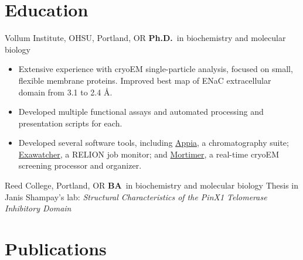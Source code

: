 \documentclass{prometheus_cv}
\begin{document}
\section{Education}
	{%
		Vollum Institute, OHSU, Portland, OR}
	{%
		\textbf{Ph.D.}~in biochemistry and molecular biology}
	{%
	\begin{itemize}
		\item Extensive experience with cryoEM single-particle analysis, focused on small, flexible membrane proteins. Improved best map of ENaC extracellular domain from 3.1 to 2.4 \AA{}.
		\item Developed multiple functional assays and automated processing and presentation scripts for each.
		\item Developed several software tools, including \href{https://doi.org/10.1371/journal.pone.0280255}{Appia}, a chromatography suite; \href{https://github.com/PlethoraChutney/exawatcher}{Exawatcher}, a RELION job monitor; and \href{https://github.com/PlethoraChutney/Mortimer}{Mortimer}, a real-time cryoEM screening processor and organizer.
	\end{itemize}
	}

		{%
			Reed College, Portland, OR}
		{%
			\textbf{BA}~in biochemistry and molecular biology}
		{%
		Thesis in Janis Shampay's lab: \textit{Structural Characteristics of the PinX1 Telomerase Inhibitory Domain}}


\section{Publications}
\end{document}

